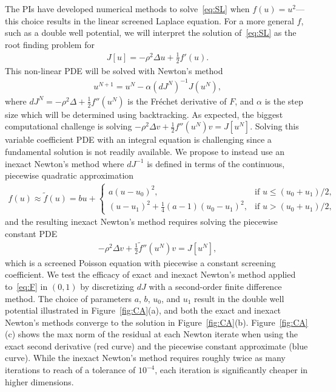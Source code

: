 The PIs have developed numerical methods to solve~\eqref{eq:SL} when
$f(u) = u^2$---this choice results in the linear screened Laplace
equation. For a more general $f$, such as a double well potential, we
will interpret the solution of~\eqref{eq:SL} as the root finding problem
for
\begin{align}
  \label{eq:F}
  J[u] = -\rho^2 \Delta u + \tfrac{1}{2}f'(u).
\end{align}
This non-linear PDE will be solved with Newton's method
\begin{align*}
  u^{N+1} = u^{N} - \alpha (dJ^N)^{-1} J(u^N),
\end{align*}
where $dJ^N = -\rho^2 \Delta + \tfrac{1}{2}f''(u^N)$ is the Fr\'{e}chet derivative
of $F$, and $\alpha$ is the step size which will be determined using
backtracking. As expected, the biggest computational challenge is
solving $- \rho^2 \Delta v + \tfrac{1}{2}f''(u^{N}) v = J[u^N]$. Solving this
variable coefficient PDE with an integral equation is challenging since
a fundamental solution is not readily available. We propose to instead
use an inexact Newton's method where $dJ^{-1}$ is defined in terms of
the continuous, piecewise quadratic approximation
\begin{align*}
  f(u) \approx \tilde{f}(u) = bu + \begin{cases}
    a(u - u_0)^2, &\mbox{if } u \leq (u_0 + u_1)/2, \\
    (u - u_1)^2 + \tfrac{1}{4}(a-1)(u_0-u_1)^2 , &\mbox{if } u > (u_0 + u_1)/2,
  \end{cases}
\end{align*}
and the resulting inexact Newton's method requires solving the piecewise
constant PDE
\begin{align}
  \label{eq:screenedPoisson}
  -\rho^2 \Delta v + \tfrac{1}{2}\tilde{f}''(u^{N})v = J[u^N],
\end{align}
which is a screened Poisson equation with piecewise a constant screening
coefficient. We test the efficacy of exact and inexact Newton's method
applied to~\eqref{eq:F} in $(0,1)$ by discretizing $dJ$ with a
second-order finite difference method. The choice of parameters $a$,
$b$, $u_0$, and $u_1$ result in the double well potential illustrated in
Figure~\ref{fig:CA}(a), and both the exact and inexact Newton's methods
converge to the solution in Figure~\ref{fig:CA}(b).
Figure~\ref{fig:CA}(c) shows the max norm of the residual at each Newton
iterate when using the exact second derivative (red curve) and the
piecewise constant approximate (blue curve). While the inexact Newton's
method requires roughly twice as many iterations to reach of a tolerance
of $10^{-4}$, each iteration is significantly cheaper in higher
dimensions.

